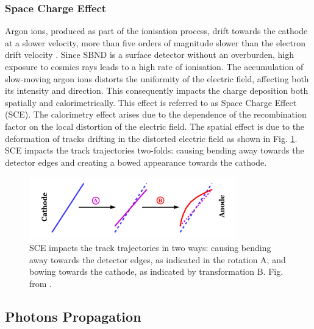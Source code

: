 \subsubsection{Space Charge Effect}
Argon ions, produced as part of the ionisation process, drift towards the cathode at a slower velocity, more than five orders of magnitude slower than the electron drift velocity \cite{icarus_sce}.
Since SBND is a surface detector without an overburden, high exposure to cosmics rays leads to a high rate of ionisation.
The accumulation of slow-moving argon ions distorts the uniformity of the electric field, affecting both its intensity and direction.
This consequently impacts the charge deposition both spatially and calorimetrically.
This effect is referred to as Space Charge Effect (SCE).
The calorimetry effect arises due to the dependence of the recombination factor on the local distortion of the electric field.
The spatial effect is due to the deformation of tracks drifting in the distorted electric field as shown in Fig. \ref{fig:SCE}.
SCE impacts the track trajectories two-folds: causing bending away towards the detector edges and creating a bowed appearance towards the cathode.
\begin{figure}[htbp] 
\centering    
\includegraphics[width=0.8\textwidth]{SCE}
\caption[SCE]{
SCE impacts the track trajectories in two ways: causing bending away towards the detector edges, as indicated in the rotation A, and bowing towards the cathode, as indicated by transformation B.
Fig. from \cite{SCE}.
}
\label{fig:SCE}
\end{figure}

\subsection{Photons Propagation}

